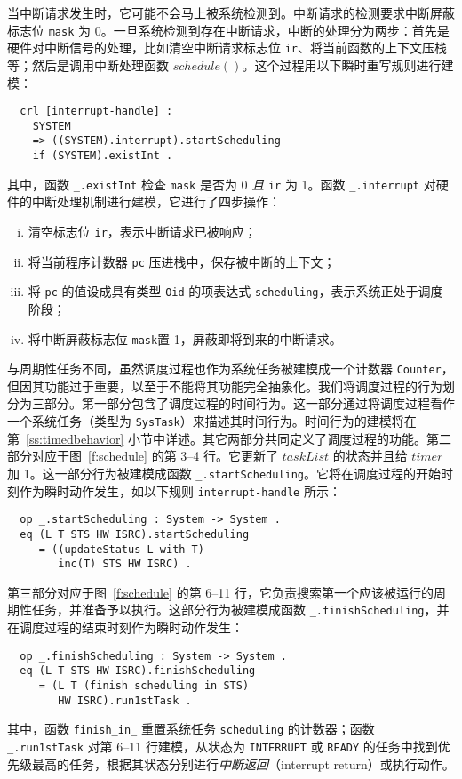 当中断请求发生时，它可能不会马上被系统检测到。中断请求的检测要求中断屏蔽标志位 \verb|mask| 为 0。一旦系统检测到存在中断请求，中断的处理分为两步：首先是硬件对中断信号的处理，比如清空中断请求标志位 \verb|ir|、将当前函数的上下文压栈等；然后是调用中断处理函数 $\mathit{schedule()}$。这个过程用以下瞬时重写规则进行建模：
\begin{verbatim}
  crl [interrupt-handle] :
    SYSTEM 
    => ((SYSTEM).interrupt).startScheduling
    if (SYSTEM).existInt .
\end{verbatim}
其中，函数 \verb|_.existInt| 检查 \verb|mask| 是否为 0 \emph{且} \verb|ir| 为 1。函数 \verb|_.interrupt| 对硬件的中断处理机制进行建模，它进行了四步操作：
\begin{enumerate}[(i)]
\item 清空标志位 \verb|ir|，表示中断请求已被响应；
\item 将当前程序计数器 \verb|pc| 压进栈中，保存被中断的上下文；
\item 将 \verb|pc| 的值设成具有类型 \verb|Oid| 的项表达式 \verb|scheduling|，表示系统正处于调度阶段；
\item 将中断屏蔽标志位 \verb|mask|置 1，屏蔽即将到来的中断请求。
\end{enumerate}

与周期性任务不同，虽然调度过程也作为系统任务被建模成一个计数器 \verb|Counter|，但因其功能过于重要，以至于不能将其功能完全抽象化。我们将调度过程的行为划分为三部分。第一部分包含了调度过程的时间行为。这一部分通过将调度过程看作一个系统任务（类型为 \verb|SysTask|）来描述其时间行为。时间行为的建模将在第~\ref{ss:timedbehavior} 小节中详述。其它两部分共同定义了调度过程的功能。第二部分对应于图~\ref{f:schedule} 的第 3--4 行。它更新了 $\mathit{taskList}$ 的状态并且给 $\mathit{timer}$ 加 1。这一部分行为被建模成函数 \verb|_.startScheduling|。它将在调度过程的开始时刻作为瞬时动作发生，如以下规则 \verb|interrupt-handle| 所示：
\begin{verbatim}
  op _.startScheduling : System -> System .
  eq (L T STS HW ISRC).startScheduling 
     = ((updateStatus L with T) 
        inc(T) STS HW ISRC) .
\end{verbatim}
第三部分对应于图~\ref{f:schedule} 的第 6--11 行，它负责搜索第一个应该被运行的周期性任务，并准备予以执行。这部分行为被建模成函数 \verb|_.finishScheduling|，并在调度过程的结束时刻作为瞬时动作发生：
\begin{verbatim}
  op _.finishScheduling : System -> System .
  eq (L T STS HW ISRC).finishScheduling
     = (L T (finish scheduling in STS) 
        HW ISRC).run1stTask .
\end{verbatim}
其中，函数 \verb|finish_in_| 重置系统任务 \verb|scheduling| 的计数器；函数 \verb|_.run1stTask| 对第 6--11 行建模，从状态为 \verb|INTERRUPT| 或 \verb|READY| 的任务中找到优先级最高的任务，根据其状态分别进行\emph{中断返回}（interrupt return）或执行动作。


